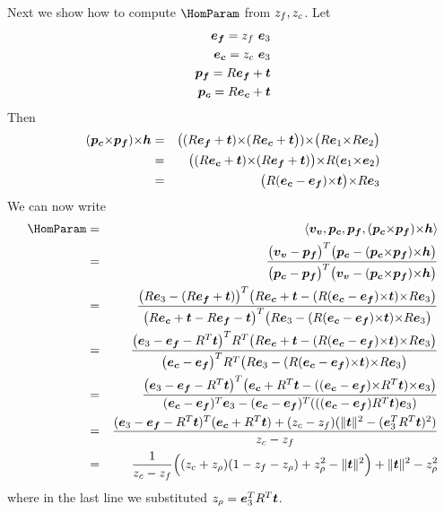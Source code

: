 Next we show how to compute $\HomParam$ from $\zfloor,\zceil$. Let
\begin{eqnarray}
  \efloor = \zfloor ~ \ez \\
  \eceil = \zceil ~ \ez \\
  \pfloor = \RetProj{\efloor} \\
  \pceil = \RetProj{\eceil}
\end{eqnarray}
Then
\begin{eqnarray}
  (\pceil \cross \pfloor) \cross \horizon &=&
    \bigl((\RetProj{\efloor}) \cross (\RetProj{\eceil}\bigr))
    \cross
    \bigl(\CamR\ex \cross
          \CamR\ey \bigr)\\
  &=& \bigl( (\RetProj{\eceil}) \cross (\RetProj{\efloor}) \bigr)
      \cross
      \CamR(\ex\cross\ey) \\
  &=& \bigl( \CamR(\eceil-\efloor)\cross\CamTr \bigr)
      \cross
      \CamR\ez \\
\end{eqnarray}
We can now write
\begin{eqnarray}
  \HomParam &=& \langle\vvpt,\pceil,\pfloor,(\pceil\cross\pfloor)\cross\horizon\rangle \\
  &=& \frac{
    \bigl(\vvpt-\pfloor\bigr)^T
    \bigl(\pceil-(\pceil\cross\pfloor)\cross\horizon\bigr)
   }{
    \bigl(\pceil-\pfloor\bigr)^T
    \bigl(\vvpt-(\pceil\cross\pfloor)\cross\horizon\bigr)
   }\\
  &=& \frac{
    \bigl(\CamR\ez - (\CamR\efloor+\CamTr)\bigr)^T
    \bigl(\CamR\eceil+\CamTr-
          (\CamR(\eceil-\efloor)\cross\CamTr)\cross\CamR\ez
          \bigr)
   }{
    \bigl(\CamR\eceil+\CamTr-\CamR\efloor-\CamTr\bigr)^T
    \bigl(\CamR\ez-
          (\CamR(\eceil-\efloor)\cross\CamTr)\cross\CamR\ez
          \bigr)
   }\\
  &=& \frac{
    \bigl(\ez - \efloor - \CamR^T\CamTr\bigr)^T R^T
    \bigl(\CamR\eceil+\CamTr-
          (\CamR(\eceil-\efloor)\cross\CamTr)\cross\CamR\ez
          \bigr)
   }{
    \bigl(\eceil-\efloor\bigr)^T R^T
    \bigl(\CamR\ez-
          (\CamR(\eceil-\efloor)\cross\CamTr)\cross\CamR\ez
          \bigr)
   }\\
  &=& \frac{
    \bigl(\ez - \efloor - \CamR^T\CamTr\bigr)^T
    \bigl(\eceil + \CamR^T\CamTr -
          ((\eceil-\efloor)\cross\CamR^T\CamTr)\cross\ez
          \bigr)
   }{
    (\eceil-\efloor)^T\ez -
    (\eceil-\efloor)^T(((\eceil-\efloor)\CamR^T\CamTr)\ez)
   }\\
  &=& \frac{
    (\ez-\efloor-\CamR^T\CamTr)^T(\eceil+\CamR^T\CamTr)
    +(\zceil-\zfloor)(\|\CamTr\|^2 - (\ez^T\CamR^T\CamTr)^2)
   }{
    \zceil-\zfloor
   }\\
  &=& \frac{1}{\zceil-\zfloor}
    \Bigl( (\zceil + \zcam)(1-\zfloor-\zcam) + \zcam^2 - \|\CamTr\|^2 \Bigr)
     + \|\CamTr\|^2 - \zcam^2
\end{eqnarray}
where in the last line we substituted $\zcam =
\ez^T\CamR^T\CamTr$.

